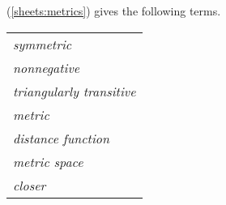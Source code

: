 \vspace{0.5cm}


(\ref{sheets:metrics})
gives the following terms.

{ \tiny
\begin{tabular}{l}

\textit{symmetric}
\\

\textit{nonnegative}
\\

\textit{triangularly transitive}
\\

\textit{metric}
\\

\textit{distance function}
\\

\textit{metric space}
\\

\textit{closer}
\\

\end{tabular}
}


\clearpage{}

